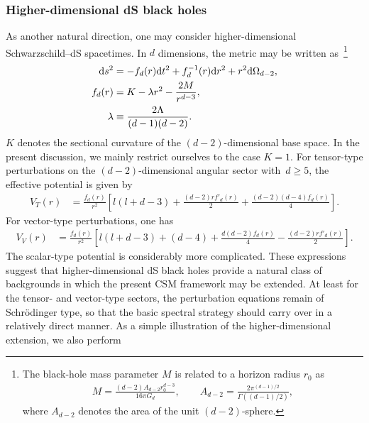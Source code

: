 \subsubsection{Higher-dimensional dS black holes}
As another natural direction, one may consider higher-dimensional
Schwarzschild--dS spacetimes.
In $d$ dimensions, the metric may be written as~\cite{Kodama:2003jz,Ishibashi:2003ap,Ishibashi:2011ws}\footnote{%
The black-hole mass parameter $M$ is
related to a horizon radius $r_0$ as
\begin{align}
    M = \frac{(d-2)A_{d-2}r_0^{d-3}}{16\pi G_d},
    \qquad
    A_{d-2} = \frac{2\pi^{(d-1)/2}}{\Gamma((d-1)/2)} ,
\end{align}
where $A_{d-2}$ denotes the area of the unit $(d-2)$-sphere.}
\begin{align}
    \mathrm{d} s^2 &= -f_d(r) \mathrm{d} t^2+f_d^{-1}(r)\mathrm{d} r^2+r^2 \mathrm{d}\Omega_{d-2},
    \label{src:2605_03277:eq:ds_d_metric}
    \\
    f_d(r) &= K-\lambda r^2-\frac{2M}{r^{d-3}},
    \label{src:2605_03277:eq:ds_d_metric_fn}
    \\
    \lambda &\equiv \frac{2\Lambda}{(d-1)(d-2)}.
\end{align}
$K$ denotes the sectional curvature of the $(d-2)$-dimensional base space.
In the present discussion, we mainly restrict ourselves to the case $K=1$.
For tensor-type perturbations on the $(d-2)$-dimensional angular sector with~$d\geq5$, the
effective potential is given by
\begin{align}
    V_T(r)
    &=
    \frac{f_d(r)}{r^2}
    \left[
        l(l+d-3)
        +\frac{(d-2)r f'_d(r)}{2}
        +\frac{(d-2)(d-4)f_d(r)}{4}
    \right].
    \label{src:2605_03277:eq:ds_d_pot_tensor}
\end{align}
For vector-type perturbations, one has
\begin{align}
    V_V(r)
    &=
    \frac{f_d(r)}{r^2}
    \left[
        l(l+d-3)
        +(d-4)
        +\frac{d(d-2)f_d(r)}{4}
        -\frac{(d-2)r f'_d(r)}{2}
    \right].
    \label{src:2605_03277:eq:ds_d_pot_vec}
\end{align}
The scalar-type potential is considerably more complicated.
These expressions suggest that higher-dimensional dS black holes provide
a natural class of backgrounds in which the present CSM framework may be
extended.
At least for the tensor- and vector-type sectors, the perturbation equations
remain of Schr\"odinger type, so that the basic spectral strategy should carry
over in a relatively direct manner.
As a simple illustration of the higher-dimensional extension, we also perform
